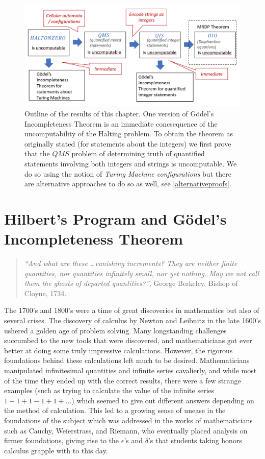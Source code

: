 \begin{figure}
\centering
\includegraphics[width=\textwidth, height=0.25\paperheight, keepaspectratio]{../figure/godelstructure.png}
\caption{Outline of the results of this chapter. One version of Gödel's
Incompleteness Theorem is an immediate concsequence of the
uncomputability of the Halting problem. To obtain the theorem as
originally stated (for statements about the integers) we first prove
that the \(\ensuremath{\mathit{QMS}}\) problem of determining truth of
quantified statements involving both integers and strings is
uncomputable. We do so using the notion of \emph{Turing Machine
configurations} but there are alternative approaches to do so as well,
see \cref{alternativeproofs}.}
\label{godelstructurefig}
\end{figure}

\section{Hilbert's Program and Gödel's Incompleteness
Theorem}\label{godelproofdef}

\begin{quote}
\emph{``And what are these \ldots vanishing increments? They are neither
finite quantities, nor quantities infinitely small, nor yet nothing. May
we not call them the ghosts of departed quantities?''}, George Berkeley,
Bishop of Cloyne, 1734.
\end{quote}

The 1700's and 1800's were a time of great discoveries in mathematics
but also of several crises. The discovery of calculus by Newton and
Leibnitz in the late 1600's ushered a golden age of problem solving.
Many longstanding challenges succumbed to the new tools that were
discovered, and mathematicians got ever better at doing some truly
impressive calculations. However, the rigorous foundations behind these
calculations left much to be desired. Mathematicians manipulated
infinitesimal quantities and infinite series cavalierly, and while most
of the time they ended up with the correct results, there were a few
strange examples (such as trying to calculate the value of the infinite
series \(1-1+1-1+1+\ldots\)) which seemed to give out different answers
depending on the method of calculation. This led to a growing sense of
unease in the foundations of the subject which was addressed in the
works of mathematicians such as Cauchy, Weierstrass, and Riemann, who
eventually placed analysis on firmer foundations, giving rise to the
\(\epsilon\)'s and \(\delta\)'s that students taking honors calculus
grapple with to this day.

